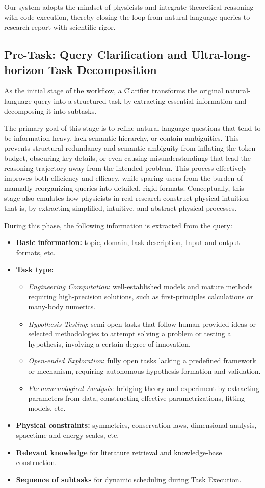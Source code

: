 \documentclass[11pt, a4paper, logo, copyright, nonumbering]{SAI}
\begin{document}
Our system adopts the mindset of physicists and integrate theoretical reasoning with code execution, thereby closing the loop from natural-language queries to research report with scientific rigor.

\subsection{Pre-Task: Query Clarification and Ultra-long-horizon Task Decomposition}
As the initial stage of the workflow, a Clarifier transforms the original natural-language query into a structured task by extracting essential information and decomposing it into subtasks.

The primary goal of this stage is to refine natural-language questions that tend to be information-heavy, lack semantic hierarchy, or contain ambiguities. This prevents structural redundancy and semantic ambiguity from inflating the token budget, obscuring key details, or even causing misunderstandings that lead the reasoning trajectory away from the intended problem. This process effectively improves both efficiency and efficacy, while sparing users from the burden of manually reorganizing queries into detailed, rigid formats. Conceptually, this stage also emulates how physicists in real research construct physical intuition---that is, by extracting simplified, intuitive, and abstract physical processes.

During this phase, the following information is extracted from the query:

\begin{itemize}
    \item \textbf{Basic information:} topic, domain, task description, Input and output formats, etc.
    \item \textbf{Task type:}
    \begin{itemize}
        \item \emph{Engineering Computation}: well-established models and mature methods requiring high-precision solutions, such as first-principles calculations or many-body numerics.
        \item \emph{Hypothesis Testing}: semi-open tasks that follow human-provided ideas or selected methodologies to attempt solving a problem or testing a hypothesis, involving a certain degree of innovation.
        \item \emph{Open-ended Exploration}: fully open tasks lacking a predefined framework or mechanism, requiring autonomous hypothesis formation and validation.
        \item \emph{Phenomenological Analysis}: bridging theory and experiment by extracting parameters from data, constructing effective parametrizations, fitting models, etc.
    \end{itemize}
    \item \textbf{Physical constraints:} symmetries, conservation laws, dimensional analysis, spacetime and energy scales, etc.
    \item \textbf{Relevant knowledge} for literature retrieval and knowledge-base construction.
    \item \textbf{Sequence of subtasks} for dynamic scheduling during Task Execution.
\end{itemize}
\end{document}
